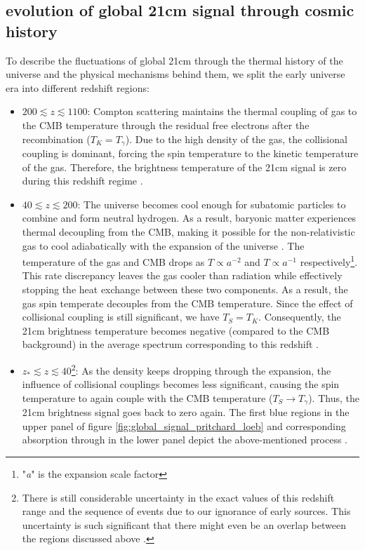 \documentclass[12pt, TexShade, letterpaper]{report}
\begin{document}
\subsection{evolution of global 21cm signal through cosmic history}
To describe the fluctuations of global 21cm through the thermal history of the universe and the physical mechanisms behind them, we split the early universe era into different redshift regions:\par
\begin{itemize}
\item $200 \lesssim z \lesssim 1100$: Compton scattering maintains the thermal coupling of gas to the CMB temperature through the residual free electrons after the recombination ($T_K = T_\gamma$). Due to the high density of the gas, the collisional coupling is dominant, forcing the spin temperature to the kinetic temperature of the gas. Therefore, the brightness temperature of the 21cm signal is zero during this redshift regime \cite{21century}.\par

\item $40 \lesssim z \lesssim 200$: The universe becomes cool enough for subatomic particles to combine and form neutral hydrogen. As a result, baryonic matter experiences thermal decoupling from the CMB, making it possible for the non-relativistic gas to cool adiabatically with the expansion of the universe \cite{21century}. The temperature of the gas and CMB drops as $T\propto a^{-2}$ and $T\propto a^{-1}$ respectively\footnote{"\emph{a}" is the expansion scale factor}. This rate discrepancy leaves the gas cooler than radiation while effectively stopping the heat exchange between these two components. As a result, the gas spin temperate decouples from the CMB temperature. Since the effect of collisional coupling is still significant, we have $T_S = T_K$. Consequently, the 21cm brightness temperature becomes negative (compared to the CMB background) in the average spectrum corresponding to this redshift \cite{map_universe, 21century}.\par

\item $z_* \lesssim z \lesssim 40$\footnote{There is still considerable uncertainty in the exact values of this redshift range and the sequence of events due to our ignorance of early sources. This uncertainty is such significant that there might even be an overlap between the regions discussed above \cite{21century}.}: As the density keeps dropping through the expansion, the influence of collisional couplings becomes less significant, causing the spin temperature to again couple with the CMB temperature ($T_S \rightarrow T_\gamma$). Thus, the 21cm brightness signal goes back to zero again\cite{map_universe}. The first blue regions in the upper panel of figure \ref{fig:global_signal_pritchard_loeb} and corresponding absorption through in the lower panel depict the above-mentioned process \cite{map_universe, 21century}.\par


\end{itemize}
\end{document}
